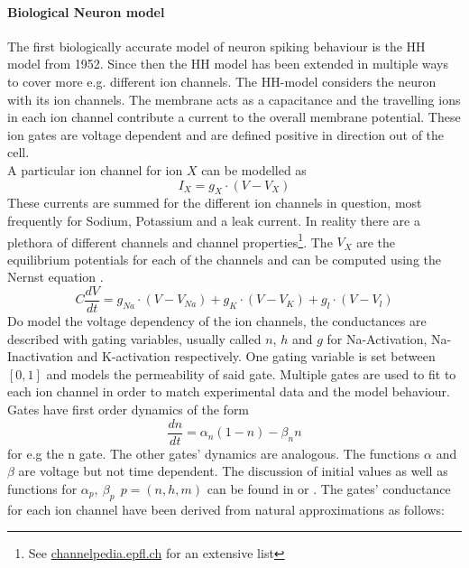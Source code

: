 	\paragraph{Biological Neuron model}
	The first biologically accurate model of neuron spiking behaviour is the \ac{HH} model from 1952\cite{hodgkin_currents_1952}. Since then the \ac{HH} model has been extended in multiple ways to cover more e.g. different ion channels. The \ac{HH}-model considers the neuron with its ion channels. The membrane acts as a capacitance and the travelling ions in each ion channel contribute a current to the overall membrane potential. These ion gates are voltage dependent and are defined positive in direction out of the cell.\\
	A particular ion channel for ion $X$ can be modelled as
	\begin{equation}
	I_X= g_X \cdot (V-V_X)
	\end{equation}
	These currents are summed for the different ion channels in question, most frequently for Sodium, Potassium and a leak current. In reality there are a plethora of different channels and channel properties\footnote{See  \url{channelpedia.epfl.ch} for an extensive list}. The $V_X$ are the equilibrium potentials for each of the channels and can be computed using the Nernst equation \cite{johnston_foundations_1995}.
	\begin{equation}
	C \frac{dV}{dt} = g_{Na} \cdot (V-V_{Na}) + g_K \cdot (V-V_K) + g_l \cdot (V-V_l)
	\end{equation}
	Do model the voltage dependency of the ion channels, the conductances are described with gating variables, usually called $n$, $h$ and $g$ for Na-Activation, Na-Inactivation and K-activation respectively. One gating variable is set between $[0,1]$ and models the permeability of said gate. Multiple gates are used to fit to each ion channel in order to match experimental data and the model behaviour.\\
	Gates have first order dynamics of the form
	\begin{equation}
	\frac{dn}{dt} = \alpha_n(1-n) - \beta_n n
	\end{equation}
	for e.g the n gate. The other gates' dynamics are analogous. The functions $\alpha$ and $\beta$ are voltage but not time dependent. The discussion of initial values as well as functions for $\alpha_p,\ \beta_p\ \ p = (n,h,m)$ can be found in \cite{hodgkin_quantitative_1952} or \cite{johnston_foundations_1995}. The gates' conductance for each ion channel have been derived from natural approximations as follows:
